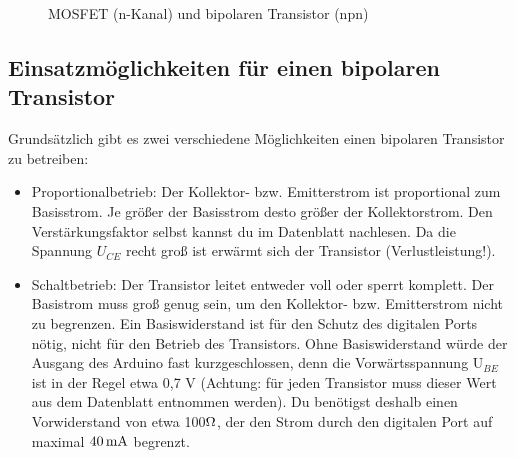 \begin{figure}[h]
  \begin{center}
  \qquad\qquad
  \label{fig:pinout}
  \caption{MOSFET (n-Kanal) und bipolaren Transistor (npn)}
  \end{center}
\end{figure}


\subsection{Einsatzmöglichkeiten für einen bipolaren Transistor}
Grundsätzlich gibt es  zwei verschiedene Möglichkeiten einen bipolaren Transistor zu betreiben:
\begin{itemize}
\item Proportionalbetrieb: Der Kollektor- bzw. Emitterstrom ist proportional zum Basisstrom. Je größer der Basisstrom desto größer der Kollektorstrom. Den Verstärkungsfaktor selbst kannst du im Datenblatt nachlesen. Da die Spannung $U_{CE}$ recht groß ist erwärmt sich der Transistor (Verlustleistung!).
\item Schaltbetrieb: Der Transistor leitet entweder voll oder sperrt komplett. Der Basistrom muss groß genug sein, um den Kollektor- bzw. Emitterstrom nicht zu begrenzen. Ein Basiswiderstand ist für den Schutz des digitalen Ports nötig, nicht für den Betrieb des Transistors. Ohne Basiswiderstand würde der Ausgang des Arduino fast kurzgeschlossen, denn die Vorwärtsspannung U$_{BE}$ ist in der Regel etwa 0,7 V (Achtung: für jeden Transistor muss dieser Wert aus dem Datenblatt entnommen werden). Du benötigst deshalb einen Vorwiderstand von etwa 100$\Omega$, der den Strom durch den digitalen Port auf maximal $40\operatorname{mA}$ begrenzt.
\end{itemize}

